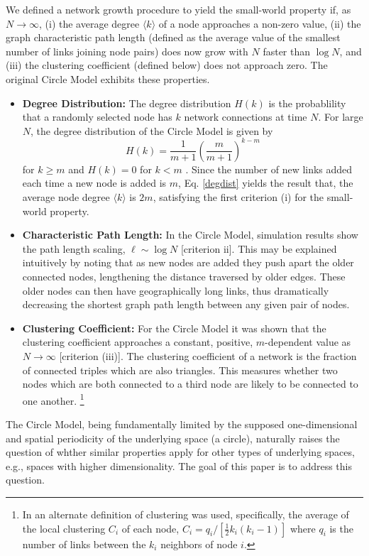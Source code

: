 \documentclass[aps,pre,reprint,superscriptaddress,amsmath,amssymb,nofootinbib]{revtex4-1}
\begin{document}
We defined a network growth procedure to yield the small-world property if, as $N \to \infty$,
(i) the average degree $\langle k \rangle$ of a node approaches a non-zero value,
(ii) the graph characteristic path length (defined as the average value of the smallest number of links joining node pairs) does now grow with $N$ faster than $\log N$, and
(iii) the clustering coefficient (defined below) does not approach zero.
The original Circle Model exhibits these properties.
\begin{itemize}
  \item \textbf{Degree Distribution:} The degree distribution $H(k)$ is the probablility that a randomly selected node has $k$ network connections at time $N$.
For large $N$, the degree distribution of the Circle Model is given by 
\begin{equation}\label{degdist}
H(k) = \frac{1}{m+1}\left(\frac{m}{m+1}\right)^{k-m}
\end{equation}
for $k \geq m$ and $H(k) = 0$ for $k < m$ \cite{ozik2004}.
Since the number of new links added each time a new node is added is $m$, Eq. \ref{degdist} yields the result that, the average node degree $\langle k \rangle$ is $2m$, satisfying the first criterion (i) for the small-world property.
  \item \textbf{Characteristic Path Length:} In the Circle Model, simulation results show the path length scaling, $\ell \sim \log N$ [criterion ii].
This may be explained intuitively by noting that as new nodes are added they push apart the older connected nodes, lengthening the distance traversed by older edges. 
These older nodes can then have geographically long links, thus dramatically decreasing the shortest graph path length between any given pair of nodes.
  \item \textbf{Clustering Coefficient:} For the Circle Model it was shown  that the clustering coefficient approaches a constant, positive, $m$-dependent value as $N \to \infty$ [criterion (iii)]. 
The clustering coefficient of a network is the fraction of connected triples which are also triangles.
This measures whether two nodes which are both connected to a third node are likely to be connected to one another. \footnote{In \cite{ozik2004} an alternate definition of clustering was used, specifically, the average of the local clustering $C_i$ of each node, $C_i = q_i/[\frac{1}{2} k_i (k_i-1)]$ where $q_i$ is the number of links between the $k_i$ neighbors of node $i$.}
\end{itemize}
The Circle Model, being fundamentally limited by the supposed one-dimensional and spatial periodicity of the underlying space (a circle), naturally raises the question of whther similar properties apply for other types of underlying spaces, e.g., spaces with higher dimensionality. 
The goal of this paper is to address this question.
\end{document}
